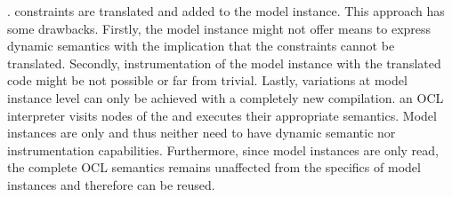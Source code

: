	 \cite{demuthRGWS09}.	
	 constraints are 
	translated  and added to the model instance. 
	This approach has some drawbacks. 
	Firstly, the model instance might not offer means to express dynamic semantics with 
	the implication that the constraints cannot be translated. Secondly, 
  instrumentation of the model instance with the translated code might be not possible 
	or far from trivial. Lastly, variations at model instance level can only be achieved with 
	a completely new compilation.  
	an OCL interpreter visits nodes of the  and 
	executes their appropriate semantics. Model instances are only 
	 and thus neither 
	need to have dynamic semantic nor instrumentation capabilities. Furthermore, 
	since model instances are only read, the complete OCL semantics remains 
	unaffected from the specifics of model instances and therefore can be reused.
	

	
